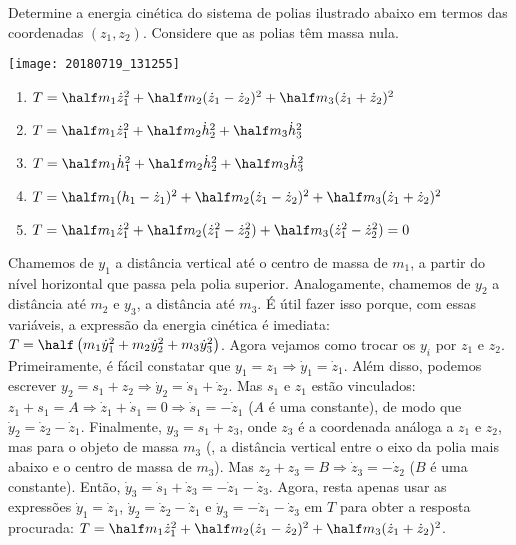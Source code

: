 \begin{question}
  	Determine a energia cinética do sistema de polias ilustrado abaixo em termos das coordenadas $(z_1, z_2)$.
  	Considere que as polias têm massa nula.

  	\begin{center}
    	\texttt{[image: 20180719\_131255]}
    \end{center}

  	\begin{enumerate}
  		\item $T = \half m_1 \dot z_1^2 + \half m_2 (\dot z_1 - \dot z_2)^2 + \half m_3 (\dot z_1 + \dot z_2)^2$ \rightanswer
  		\item $T = \half m_1 \dot z_1^2 + \half m_2 \dot h_2^2 + \half m_3 \dot h_3^2$
  		\item $T = \half m_1 \dot h_1^2 + \half m_2 \dot h_2^2 + \half m_3 \dot h_3^2$
  		\item $T = \half m_1 (h_1 - \dot z_1)^2 + \half m_2 (\dot z_1 - \dot z_2)^2 + \half m_3 (\dot z_1 + \dot z_2)^2$
  		\item $T = \half m_1 \dot z_1^2 + \half m_2 (\dot z_1^2 - \dot z_2^2) + \half m_3 (\dot z_1^2 - \dot z_2^2) = 0$
  	\end{enumerate}

    \begin{solution}
      Chamemos de $y_1$ a distância vertical até o centro de massa de $m_1$, a partir do nível horizontal que passa pela polia superior.
      Analogamente, chamemos de $y_2$ a distância até $m_2$ e $y_3$, a distância até $m_3$.
      É útil fazer isso porque, com essas variáveis, a expressão da energia cinética é imediata: $T = \half \left(m_1 \dot y_1^2 + m_2 \dot y_2^2 + m_3 \dot y_3^2\right)$.
      Agora vejamos como trocar os $y_i$ por $z_1$ e $z_2$.
      Primeiramente, é fácil constatar que $y_1 = z_1 \Rightarrow \dot y_1 = \dot z_1$.
      Além disso, podemos escrever $y_2 = s_1 + z_2 \Rightarrow \dot y_2 = \dot s_1 + \dot z_2$.
      Mas $s_1$ e $z_1$ estão vinculados: $z_1 + s_1 = A \Rightarrow \dot z_1 + \dot s_1 = 0 \Rightarrow \dot s_1 = - \dot z_1$ ($A$ é uma constante), de modo que $\dot y_2 = \dot z_2 - \dot z_1$.
      Finalmente, $y_3 = s_1 + z_3$, onde $z_3$ é a coordenada análoga a $z_1$ e $z_2$, mas para o objeto de massa $m_3$ (\ie, a distância vertical entre o eixo da polia mais abaixo e o centro de massa de $m_3$).
      Mas $z_2 + z_3 = B \Rightarrow \dot z_3 = - \dot z_2$ ($B$ é uma constante).
      Então, $\dot y_3 = \dot s_1 + \dot z_3 = -\dot z_1 - \dot z_3$.
      Agora, resta apenas usar as expressões $\dot y_1 = \dot z_1$, $\dot y_2 = \dot z_2 - \dot z_1$ e $\dot y_3 = -\dot z_1 - \dot z_3$ em $T$ para obter a resposta procurada: $T = \half m_1 \dot z_1^2 + \half m_2 (\dot z_1 - \dot z_2)^2 + \half m_3 (\dot z_1 + \dot z_2)^2$.
    \end{solution}
\end{question}